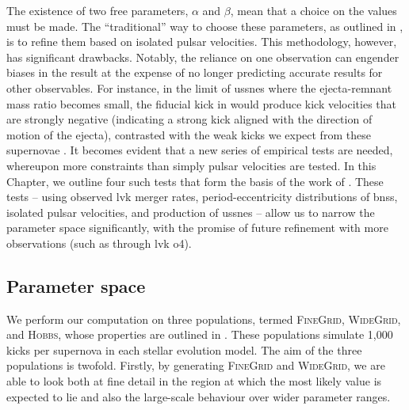 The existence of two free parameters, $\alpha$ and $\beta$, mean that a choice on the values must be made. The ``traditional'' way to choose these parameters, as outlined in \citet{Bray:2016, Bray:2018}, is to refine them based on isolated pulsar velocities. This methodology, however, has significant drawbacks. Notably, the reliance on one observation can engender biases in the result at the expense of no longer predicting accurate results for other observables. For instance, in the limit of \glspl{ussne} where the ejecta-remnant mass ratio becomes small, the fiducial kick in \citet{Bray:2018} would produce kick velocities that are strongly negative (indicating a strong kick aligned with the direction of motion of the ejecta), contrasted with the weak kicks we expect from these supernovae \citep[e.g.,][]{Willcox:2021}. It becomes evident that a new series of empirical tests are needed, whereupon more constraints than simply pulsar velocities are tested. In this Chapter, we outline four such tests that form the basis of the work of \citet{Richards:2023}. These tests -- using observed \gls{lvk} merger rates, period-eccentricity distributions of \glspl{bns}, isolated pulsar velocities, and production of \glspl{ussne} -- allow us to narrow the parameter space significantly, with the promise of future refinement with more observations (such as through \gls{lvk} \gls{o4}).

\subsection{Parameter space}

We perform our computation on three populations, termed \textsc{FineGrid}, \textsc{WideGrid}, and \textsc{Hobbs}, whose properties are outlined in . These populations simulate 1,000 kicks per supernova in each stellar evolution model. The aim of the three populations is twofold. Firstly, by generating \textsc{FineGrid} and \textsc{WideGrid}, we are able to look both at fine detail in the region at which the most likely value is expected to lie and also the large-scale behaviour over wider parameter ranges.

